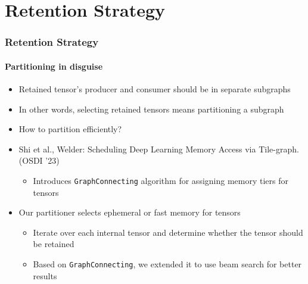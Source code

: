 \section{Retention Strategy}
\begin{frame}
\frametitle{Retention Strategy}
\framesubtitle{Partitioning in disguise}

\begin{itemize}
  \item Retained tensor's producer and consumer should be in separate subgraphs
  \item In other words, selecting retained tensors means partitioning a subgraph
  \item How to partition efficiently?
  \pause
  \item Shi et al., Welder: Scheduling Deep Learning Memory Access via Tile-graph. (OSDI '23)
  \begin{itemize}
    \item Introduces \texttt{GraphConnecting} algorithm for assigning memory tiers for tensors
  \end{itemize}
  \pause
  \item Our partitioner selects ephemeral or fast memory for tensors
  \begin{itemize}
    \item Iterate over each internal tensor and determine whether the tensor should be retained
    \item Based on \texttt{GraphConnecting}, we extended it to use beam search for better results
  \end{itemize}
\end{itemize}
\end{frame}
